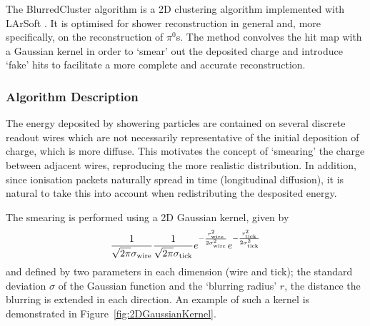 The BlurredCluster algorithm is a 2D clustering algorithm \cite{KabothThesis} implemented with LArSoft \cite{BlurredCluster,BlurredClusterLArSoft}.  It is optimised for shower reconstruction in general and, more specifically, on the reconstruction of $\pi^0$s.  The method convolves the hit map with a Gaussian kernel in order to `smear' out the deposited charge and introduce `fake' hits to facilitate a more complete and accurate reconstruction.

\subsubsection{Algorithm Description}\label{sec:BlurredClusterDescription}

The energy deposited by showering particles are contained on several discrete readout wires which are not necessarily representative of the initial deposition of charge, which is more diffuse.  This motivates the concept of `smearing' the charge between adjacent wires, reproducing the more realistic distribution.  In addition, since ionisation packets naturally spread in time (longitudinal diffusion), it is natural to take this into account when redistributing the desposited energy.

The smearing is performed using a 2D Gaussian kernel, given by
\begin{equation}\label{eq:2DGaussianKernel}
  \frac{1}{\sqrt{2\pi}\sigma_{\textnormal{wire}}} \frac{1}{\sqrt{2\pi}\sigma_{\textnormal{tick}}} e^{-\frac{r_{\textnormal{wire}}^2}{2\sigma_{\textnormal{wire}}^2}} e^{-\frac{r_{\textnormal{tick}}^2}{2\sigma_{\textnormal{tick}}^2}}
\end{equation}
and defined by two parameters in each dimension (wire and tick); the standard deviation $\sigma$ of the Gaussian function and the `blurring radius' $r$, the distance the blurring is extended in each direction.  An example of such a kernel is demonstrated in Figure~\ref{fig:2DGaussianKernel}.

